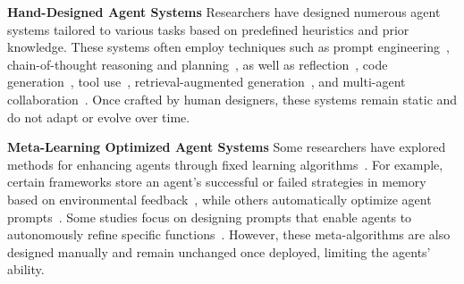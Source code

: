 \textbf{Hand-Designed Agent Systems} \quad
Researchers have designed numerous agent systems tailored to various tasks based on predefined heuristics and prior knowledge. These systems often employ techniques such as prompt engineering~\citep{chen2023unleashing,schulhoff2024prompt}, chain-of-thought reasoning and planning~\citep{wei2022chain,yao2022react}, as well as reflection~\citep{shinn2024reflexion,madaan2024self}, code generation~\citep{wang2023voyager,vemprala2024chatgpt}, tool use~\citep{nakano2021webgpt,qu2024tool}, retrieval-augmented generation~\citep{lewis2020retrieval,zhang2024survey}, and multi-agent collaboration~\citep{xu2023expertpromptinginstructinglargelanguage,wu2023autogen,qian2023communicative,hong2023metagpt}. Once crafted by human designers, these systems remain static and do not adapt or evolve over time.

\noindent\textbf{Meta-Learning Optimized Agent Systems} \quad
Some researchers have explored methods for enhancing agents through fixed learning algorithms~\citep{zhou2024symbolic,hu2024automated}. For example, certain frameworks store an agent’s successful or failed strategies in memory based on environmental feedback~\citep{liu2023think,hu2023chatdb,qian2024investigateconsolidateexploitgeneralstrategyintertask}, while others automatically optimize agent prompts~\citep{khattab2023dspy,zhang2024agent,khattab2023dspy}. Some studies focus on designing prompts that enable agents to autonomously refine specific functions~\citep{zhangoffline}. 
However, these meta-algorithms are also designed manually and remain unchanged once deployed, limiting the agents' ability.

